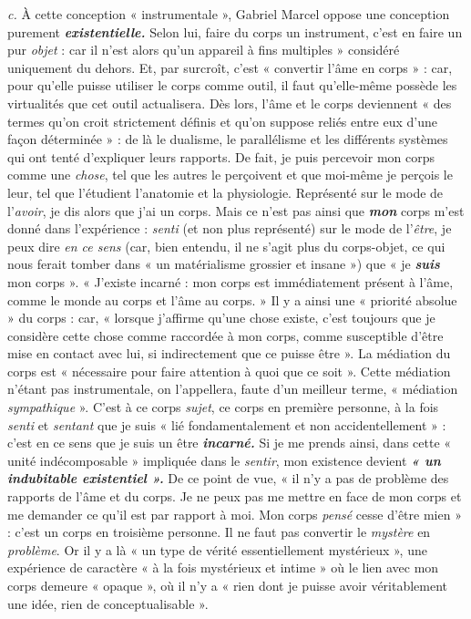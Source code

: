 {\it c.} À cette conception « instrumentale », Gabriel Marcel oppose
une conception purement \textbf{\textit {existentielle.}} Selon lui, faire du corps un
instrument, c’est en faire un pur {\it objet} : car il n’est alors qu'un
appareil à fins multiples » considéré uniquement du dehors. Et, par
surcroît, c’est « convertir l’âme en corps » : car, pour qu’elle puisse
utiliser le corps comme outil, il faut qu’elle-même possède les virtualités
que cet outil actualisera. Dès lors, l’âme et le corps deviennent
« des termes qu’on croit strictement définis et qu’on suppose reliés
entre eux d’une façon déterminée » : de là le dualisme, le parallélisme
et les différents systèmes qui ont tenté d'expliquer leurs rapports. De
fait, je puis percevoir mon corps comme une {\it chose}, tel que les autres le
perçoivent et que moi-même je perçois le leur, tel que l’étudient
l'anatomie et la physiologie. Représenté sur le mode de l'{\it avoir}, je
dis alors que j'ai un corps. Mais ce n’est pas ainsi que \textbf{\textit {mon}} corps
m'est donné dans l'expérience : {\it senti} (et non plus représenté) sur le
mode de l'{\it être}, je peux dire {\it en ce sens} (car, bien entendu, il ne s’agit
plus du corps-objet, ce qui nous ferait tomber dans « un matérialisme
grossier et insane ») que « je \textbf{\textit {suis}} mon corps ». « J’existe incarné :
mon corps est immédiatement présent à l’âme, comme le monde au
corps et l’âme au corps. » Il y a ainsi une « priorité absolue » du corps :
car, « lorsque j'affirme qu’une chose existe, c’est toujours que je considère
cette chose comme raccordée à mon corps, comme susceptible
d’être mise en contact avec lui, si indirectement que ce puisse être ».
La médiation du corps est « nécessaire pour faire attention à quoi
que ce soit ». Cette médiation n’étant pas instrumentale, on l’appellera,
faute d’un meilleur terme, « médiation {\it sympathique} ». C’est à ce corps
{\it sujet}, ce corps en première personne, à la fois {\it senti} et {\it sentant} que je
suis « lié fondamentalement et non accidentellement » : c’est en ce
sens que je suis un être \textbf{\textit {incarné.}} Si je me prends ainsi, dans cette
« unité indécomposable » impliquée dans le {\it sentir}, mon existence
devient \textbf{\textit {« un indubitable existentiel ».}} De ce point de vue, « il n’y a
pas de problème des rapports de l’âme et du corps. Je ne peux pas
me mettre en face de mon corps et me demander ce qu’il est par rapport
à moi. Mon corps {\it pensé} cesse d’être mien » : c’est un corps en
troisième personne. Il ne faut pas convertir le {\it mystère} en {\it problème}. Or
il y a là « un type de vérité essentiellement mystérieux », une expérience
de caractère « à la fois mystérieux et intime » où le lien avec
mon corps demeure « opaque », où il n’y a « rien dont je puisse avoir
véritablement une idée, rien de conceptualisable ».

